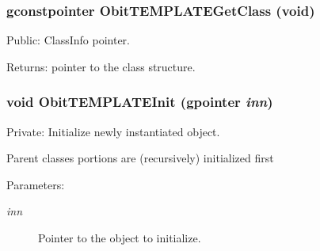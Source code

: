 \subsubsection{\setlength{\rightskip}{0pt plus 5cm}gconstpointer Obit\-TEMPLATEGet\-Class (void)}\label{ObitTEMPLATE_8c_a7}


Public: Class\-Info pointer. 

\begin{Desc}
\item[Returns:]pointer to the class structure. \end{Desc}
\subsubsection{\setlength{\rightskip}{0pt plus 5cm}void Obit\-TEMPLATEInit (gpointer {\em inn})}\label{ObitTEMPLATE_8c_a3}


Private: Initialize newly instantiated object. 

Parent classes portions are (recursively) initialized first \begin{Desc}
\item[Parameters:]
\begin{description}
\item[{\em inn}]Pointer to the object to initialize. \end{description}
\end{Desc}
